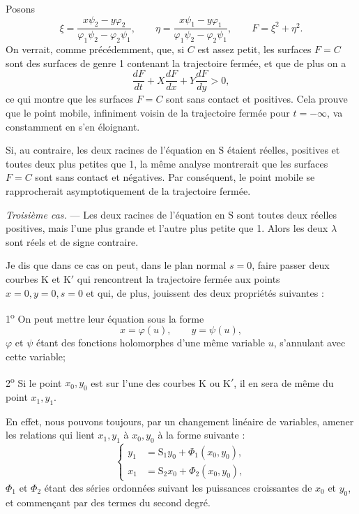 \documentclass[11pt]{article}
\begin{document}
Posons
\[
\xi=\frac{x\psi_2-y\varphi_2}{\varphi_1\psi_2-\varphi_2\psi_1},
\qquad
\eta=\frac{x\psi_1-y\varphi_1}{\varphi_1\psi_2-\varphi_2\psi_1},
\qquad
F=\xi^2+\eta^2.
\]
On verrait, comme précédemment, que, si $C$ est assez petit, les surfaces $F=C$ sont des surfaces de genre 1 contenant la trajectoire fermée, et que de plus on a
\[
\frac{dF}{dt}+X\frac{dF}{dx}+Y\frac{dF}{dy}>0,
\]
ce qui montre que les surfaces $F=C$ sont sans contact et positives. Cela prouve que le point mobile, infiniment voisin de la trajectoire fermée pour $t=-\infty$, va constamment en s’en éloignant.

Si, au contraire, les deux racines de l’équation en $\mathrm{S}$ étaient réelles, positives et toutes deux plus petites que 1, la même analyse montrerait que les surfaces $F=C$ sont sans contact et négatives. Par conséquent, le point mobile se rapprocherait asymptotiquement de la trajectoire fermée.

\emph{Troisième cas.} — Les deux racines de l’équation en $\mathrm{S}$ sont toutes deux réelles positives, mais l’une plus grande et l’autre plus petite que 1. Alors les deux $\lambda$ sont réels et de signe contraire.

Je dis que dans ce cas on peut, dans le plan normal $s=0$, faire passer deux courbes K et K$'$ qui rencontrent la trajectoire fermée aux points $x=0,y=0,s=0$ et qui, de plus, jouissent des deux propriétés suivantes :

1\textsuperscript{o} On peut mettre leur équation sous la forme
\[
x=\varphi(u),
\qquad
y=\psi(u),
\]
$\varphi$ et $\psi$ étant des fonctions holomorphes d’une même variable $u$, s’annulant avec cette variable;

2\textsuperscript{o} Si le point $x_0,y_0$ est sur l’une des courbes K ou K$'$, il en sera de même du point $x_1,y_1$.

En effet, nous pouvons toujours, par un changement linéaire de variables, amener les relations qui lient $x_1,y_1$ à $x_0,y_0$ à la forme suivante :
\begin{equation}
\left\{
\begin{aligned}
y_1&=\mathrm{S}_1y_0+\Phi_1(x_0,y_0),\\
x_1&=\mathrm{S}_2x_0+\Phi_2(x_0,y_0),
\end{aligned}
\right.
\tag{3}
\end{equation}
$\Phi_1$ et $\Phi_2$ étant des séries ordonnées suivant les puissances croissantes de $x_0$ et $y_0$, et commençant par des termes du second degré.
\end{document}
